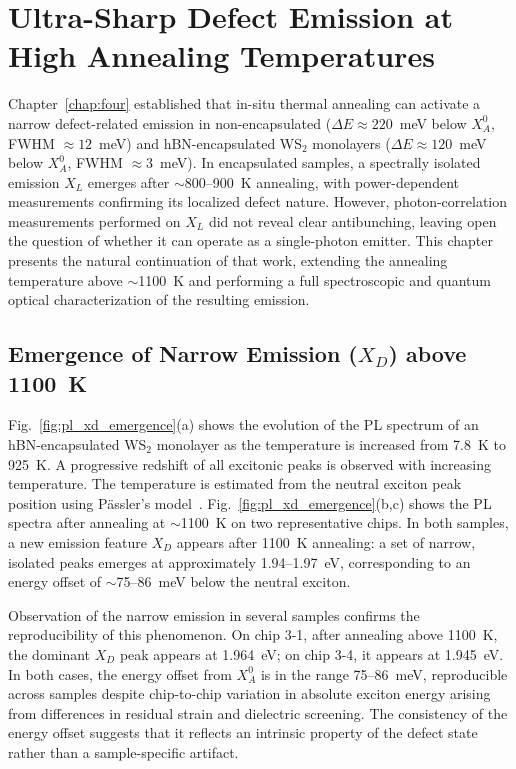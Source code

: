 

\section{Ultra-Sharp Defect Emission at High Annealing Temperatures}
\label{sec:Ultra-Sharp Defect Emission}

Chapter~\ref{chap:four} established that in-situ thermal annealing can activate a narrow defect-related emission in non-encapsulated ($\Delta E \approx 220$~meV below $X_A^0$, FWHM $\approx 12$~meV) and hBN-encapsulated WS$_2$ monolayers ($\Delta E \approx 120$~meV below $X_A^0$, FWHM $\approx 3$~meV). In encapsulated samples, a spectrally isolated emission $X_L$ emerges after $\sim$800--900~K annealing, with power-dependent measurements confirming its localized defect nature. However, photon-correlation measurements performed on $X_L$ did not reveal clear antibunching, leaving open the question of whether it can operate as a single-photon emitter. This chapter presents the natural continuation of that work, extending the annealing temperature above $\sim$1100~K and performing a full spectroscopic and quantum optical characterization of the resulting emission.

\subsection{Emergence of Narrow Emission ($X_D$) above 1100~K}
\label{subsec:Emergence of Narrow Emission XD above 1100K}

Fig.~\ref{fig:pl_xd_emergence}(a) shows the evolution of the PL spectrum of an hBN-encapsulated WS$_2$ monolayer as the temperature is increased from 7.8~K to 925~K. A progressive redshift of all excitonic peaks is observed with increasing temperature. The temperature is estimated from the neutral exciton peak position using Pässler's model~\cite{passler-1999}. Fig.~\ref{fig:pl_xd_emergence}(b,c) shows the PL spectra after annealing at $\sim$1100~K on two representative chips. In both samples, a new emission feature $X_D$ appears after 1100~K annealing: a set of narrow, isolated peaks emerges at approximately 1.94--1.97~eV, corresponding to an energy offset of $\sim$75--86~meV below the neutral exciton.

Observation of the narrow emission in several samples confirms the reproducibility of this phenomenon. On chip 3-1, after annealing above 1100~K, the dominant $X_D$ peak appears at 1.964~eV; on chip 3-4, it appears at 1.945~eV. In both cases, the energy offset from $X_A^0$ is in the range 75--86~meV, reproducible across samples despite chip-to-chip variation in absolute exciton energy arising from differences in residual strain and dielectric screening. The consistency of the energy offset suggests that it reflects an intrinsic property of the defect state rather than a sample-specific artifact.

